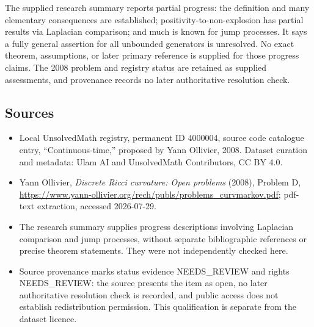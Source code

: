 \documentclass[11pt]{article}
\begin{document}
The supplied research summary reports partial progress: the definition and many elementary consequences are established; positivity-to-non-explosion has partial results via Laplacian comparison; and much is known for jump processes. It says a fully general assertion for all unbounded generators is unresolved. No exact theorem, assumptions, or later primary reference is supplied for those progress claims. The 2008 problem and registry status are retained as supplied assessments, and provenance records no later authoritative resolution check.
\subsection{Sources}
\begin{itemize}
\item Local UnsolvedMath registry, permanent ID 4000004, source code catalogue entry, ``Continuous-time,'' proposed by Yann Ollivier, 2008. Dataset curation and metadata: Ulam AI and UnsolvedMath Contributors, CC BY 4.0.
\item Yann Ollivier, \emph{Discrete Ricci curvature: Open problems} (2008), Problem D, \url{https://www.yann-ollivier.org/rech/publs/problems_curvmarkov.pdf}; pdf-text extraction, accessed 2026-07-29.
\item The research summary supplies progress descriptions involving Laplacian comparison and jump processes, without separate bibliographic references or precise theorem statements. They were not independently checked here.
\item Source provenance marks status evidence NEEDS\_REVIEW and rights NEEDS\_REVIEW: the source presents the item as open, no later authoritative resolution check is recorded, and public access does not establish redistribution permission. This qualification is separate from the dataset licence.
\end{itemize}
\end{document}
